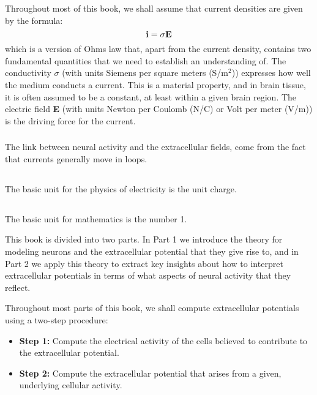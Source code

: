 {Throughout most of this book, we shall assume that current densities are given by the formula:
\begin{equation}
{\bf i} = \sigma {\bf E}
\label{Basics:eq:i}
\end{equation}
which is a version of Ohms law that, apart from the current density, contains two fundamental quantities that we need to establish an understanding of. The conductivity $\sigma$ (with units Siemens per square meters (S/m$^2$)) expresses how well the medium conducts a current. This is a material property, and in brain tissue, it is often assumed to be a constant, at least within a given brain region. The electric field {\bf E} (with units Newton per Coulomb (N/C) or Volt per meter (V/m)) is the driving force for the current.


\subsubsection{}
The link between neural activity and the extracellular fields, come from the fact that currents generally move in loops. 





\subsection{}
The basic unit for the physics of electricity is the unit charge. 


\subsection{}
The basic unit for mathematics is the number 1.




This book is divided into two parts. In Part 1 we introduce the theory for modeling neurons and the extracellular potential that they give rise to, and in Part 2 we apply this theory to extract key insights about how to interpret extracellular potentials in terms of what aspects of neural activity that they reflect.

Throughout most parts of this book, we shall compute extracellular potentials using a two-step procedure:  

\begin{itemize}
\item {\bf Step 1:} Compute the electrical activity of the cells believed to contribute to the extracellular potential. 
\item {\bf Step 2:} Compute the extracellular potential that arises from a given, underlying cellular activity.
\end{itemize}

}
